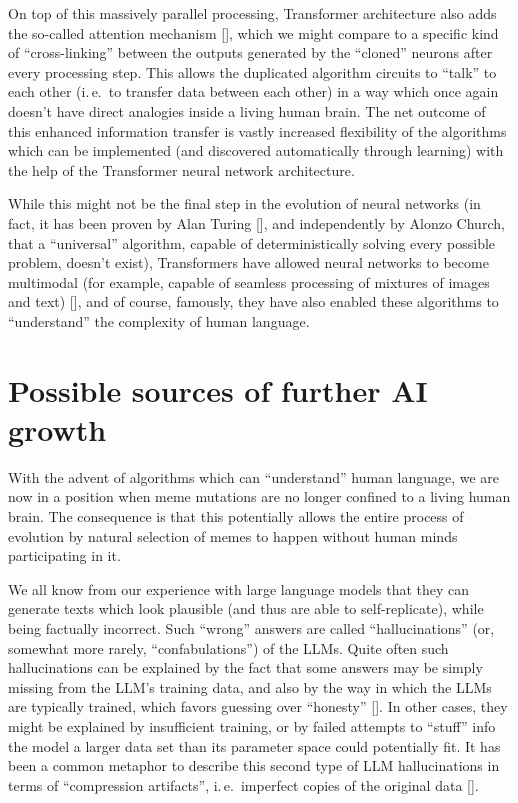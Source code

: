\documentclass[12pt]{article}
\newcommand{\citestrut}[1]{\vphantom{[}{#1}\vphantom{]}}
\renewcommand{\cite}[1]{[\hyperlink{#1}{\citestrut{#1}}]}
\begin{document}
On top of this massively parallel processing, Transformer architecture also adds the
so-called attention mechanism \cite{Attention}, which we might compare to a specific kind
of ``cross-linking'' between the outputs generated by the ``cloned'' neurons after every
processing step. This allows the duplicated algorithm circuits to ``talk'' to each other
(i.\,e.\ to transfer data between each other) in a way which once again doesn't have
direct analogies inside a living human brain. The net outcome of this enhanced
information transfer is vastly increased flexibility of the algorithms which can be
implemented (and discovered automatically through learning) with the help of the
Transformer neural network architecture.

While this might not be the final step in the evolution of neural networks (in fact, it
has been proven by Alan Turing \cite{Undecidability}, and independently by Alonzo Church,
that a ``universal'' algorithm, capable of deterministically solving every possible
problem, doesn't exist), Transformers have allowed neural networks to become multimodal
(for example, capable of seamless processing of mixtures of images and text)
\cite{Multimodality}, and of course, famously, they have also enabled these algorithms to
``understand'' the complexity of human language.

\section{Possible sources of further AI growth}

With the advent of algorithms which can ``understand'' human language, we are now in a
position when meme mutations are no longer confined to a living human brain. The
consequence is that this potentially allows the entire process of evolution by natural
selection of memes to happen without human minds participating in it.

We all know from our experience with large language models that they can generate texts
which look plausible (and thus are able to self-replicate), while being factually
incorrect. Such ``wrong'' answers are called ``hallucinations'' (or, somewhat more
rarely, ``confabulations'') of the LLMs. Quite often such hallucinations can be explained
by the fact that some answers may be simply missing from the LLM's training data, and
also by the way in which the LLMs are typically trained, which favors guessing over
``honesty'' \cite{Hallucinations}. In other cases, they might be explained by
insufficient training, or by failed attempts to ``stuff'' info the model a larger data
set than its parameter space could potentially fit. It has been a common metaphor to
describe this second type of LLM hallucinations in terms of ``compression artifacts'',
i.\,e.\ imperfect copies of the original data \cite{Compression}.
\end{document}
